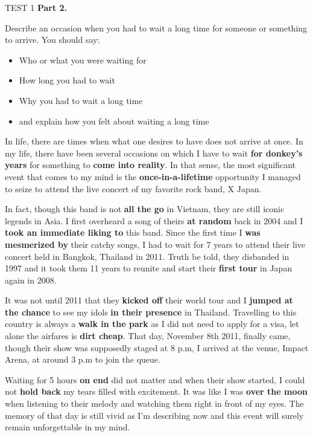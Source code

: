 \begin{glossarymc}[Cambridge 12]
\begin{test}{TEST 1}
    \noindent
    \textbf{Part 2.}
    \begin{qa}{Describe an occasion when you had to wait a long time for someone or something to arrive. You should say:}
    \begin{itemize}
        \item Who or what you were waiting for
        \item How long you had to wait
        \item Why you had to wait a long time
        \item and explain how you felt about waiting a long time
    \end{itemize}

    In life, there are times when what one desires to have does not arrive at once. In my life, there have been several occasions on which I have to wait \textbf{for donkey’s years} for something to \textbf{come into reality}. In that sense, the most significant event that comes to my mind is the \textbf{once-in-a-lifetime} opportunity I managed to seize to attend the live concert of my favorite rock band, X Japan.  

    In fact, though this band is not \textbf{all the go} in Vietnam, they are still iconic legends in Asia. I first overheard a song of theirs \textbf{at random} back in 2004 and I \textbf{took an immediate liking to} this band. Since the first time I \textbf{was mesmerized by} their catchy songs, I had to wait for 7 years to attend their live concert held in Bangkok, Thailand in 2011. Truth be told, they disbanded in 1997 and it took them 11 years to reunite and start their \textbf{first tour} in Japan again in 2008.  

    It was not until 2011 that they \textbf{kicked off} their world tour and I \textbf{jumped at the chance} to see my idols \textbf{in their presence} in Thailand. Travelling to this country is always a \textbf{walk in the park} as I did not need to apply for a visa, let alone the airfares is \textbf{dirt cheap}. That day, November 8th 2011, finally came, though their show was supposedly staged at 8 p.m, I arrived at the venue, Impact Arena, at around 3 p.m to join the queue.  

    Waiting for 5 hours \textbf{on end} did not matter and when their show started, I could not \textbf{hold back} my tears filled with excitement. It was like I was \textbf{over the moon} when listening to their melody and watching them right in front of my eyes. The memory of that day is still vivid as I’m describing now and this event will surely remain unforgettable in my mind.
    \end{qa}


\end{test}
\end{glossarymc}
